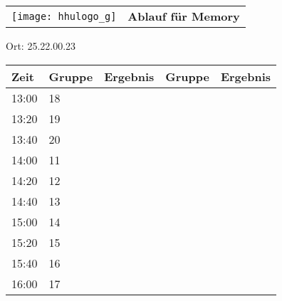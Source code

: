 \documentclass[a4paper,10pt]{article}
\def\spielh{Memory}
\def\raumhh{25.22.00.23}
\begin{document}
   \newpage
  \begin{tabularx}{\textwidth}{lc}
    \texttt{[image: hhulogo\_g]}
  & {\Huge \textbf{Ablauf für \spielh}}
  \end{tabularx}
  \LARGE
  \begin{center}
    \vspace{1cm} 
    Ort: \raumhh
  \end{center}
    \vspace{2cm} 
    \begin{tabularx}{\textwidth}{X||X|X||X|X}
	\textbf{Zeit} &\textbf{Gruppe} & \textbf{Ergebnis} &\textbf{Gruppe} & \textbf{Ergebnis}  	\\ \hline \hline
	13:00 &	18	&	&	&	\\ \hline
	13:20 &	19	&	&	&	\\ \hline
	13:40 &	20	&	&	&	\\ \hline

	14:00 &	11	&	&	&	\\ \hline
	14:20 &	12	&	&	&	\\ \hline
	14:40 &	13	&	&	&	\\ \hline

	15:00 &	14	&	&	&	\\ \hline
	15:20 &	15	&	&	&	\\ \hline
	15:40 &	16	&	&	&	\\ \hline

	16:00 &	17	&	&	&	\\ \hline
      
    \end{tabularx}
   
\end{document}
